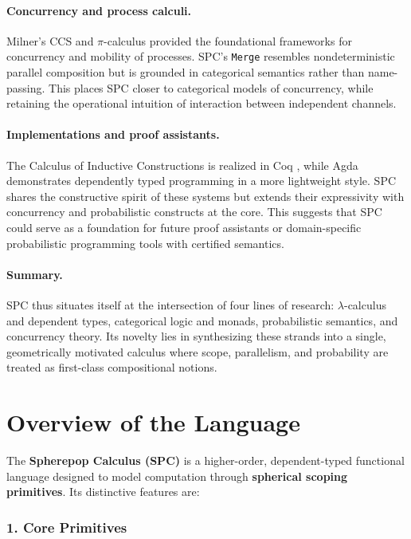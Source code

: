 \documentclass{article}
\begin{document}
\paragraph{Concurrency and process calculi.}
Milner’s CCS \cite{milner1980calculus} and $\pi$-calculus
\cite{milner1999communicating,milner1992calculus} provided the foundational
frameworks for concurrency and mobility of processes. SPC’s \texttt{Merge}
resembles nondeterministic parallel composition but is grounded in categorical
semantics rather than name-passing. This places SPC closer to categorical models
of concurrency, while retaining the operational intuition of interaction
between independent channels.

\paragraph{Implementations and proof assistants.}
The Calculus of Inductive Constructions is realized in Coq
\cite{bertot2004interactive}, while Agda
\cite{norell2009dependently} demonstrates dependently typed programming in a
more lightweight style. SPC shares the constructive spirit of these systems but
extends their expressivity with concurrency and probabilistic constructs at the
core. This suggests that SPC could serve as a foundation for future proof
assistants or domain-specific probabilistic programming tools with certified
semantics.

\paragraph{Summary.}
SPC thus situates itself at the intersection of four lines of research:
$\lambda$-calculus and dependent types, categorical logic and monads,
probabilistic semantics, and concurrency theory. Its novelty lies in
synthesizing these strands into a single, geometrically motivated calculus where
scope, parallelism, and probability are treated as first-class compositional
notions.


\section{Overview of the Language}

The \textbf{Spherepop Calculus (SPC)} is a higher-order, dependent-typed functional language designed to model computation through \textbf{spherical scoping primitives}. Its distinctive features are:

\subsubsection{1. Core Primitives}
\end{document}
